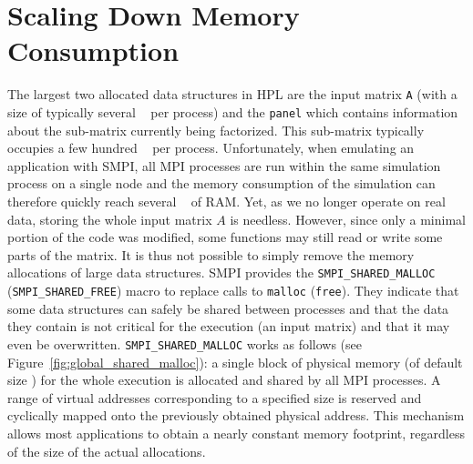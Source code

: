     \section{Scaling Down Memory Consumption}
        The largest two allocated data structures in HPL are the input matrix \texttt{A} (with a size of typically
        several \si{\giga\byte} per process) and the \texttt{panel} which contains information about the sub-matrix
        currently being factorized. This sub-matrix typically occupies a few hundred \si{\mega\byte} per process.
        Unfortunately, when emulating an application with SMPI, all MPI processes are run within the same simulation
        process on a single node and the memory consumption of the simulation can therefore quickly reach several
        \si{\tera\byte} of RAM.  Yet, as we no longer operate on real data, storing the whole input matrix \(A\) is
        needless. However, since only a minimal portion of the code was modified, some functions may still read or write
        some parts of the matrix.  It is thus not possible to simply remove the memory allocations of large data
        structures. SMPI provides the \texttt{SMPI\_SHARED\_MALLOC} (\texttt{SMPI\_SHARED\_FREE}) macro to replace calls
        to \texttt{malloc} (\texttt{free}). They indicate that some data structures can safely be shared between
        processes and that the data they contain is not critical for the execution (\eg an input matrix) and that it may
        even be overwritten. \texttt{SMPI\_SHARED\_MALLOC} works as follows (see
        Figure~\ref{fig:global_shared_malloc}): a single block of physical memory (of default size )
        for the whole execution is allocated and shared by all MPI processes.  A range of virtual addresses
        corresponding to a specified size is reserved and cyclically mapped onto the previously obtained physical
        address.  This mechanism allows most applications to obtain a nearly constant memory footprint, regardless of
        the size of the actual allocations.


